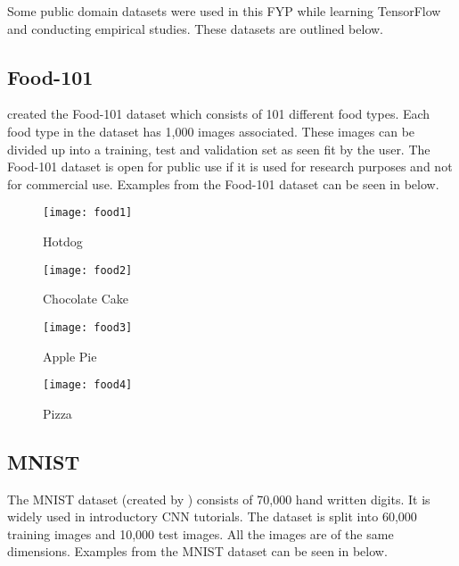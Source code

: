 Some public domain datasets were used in this FYP while learning TensorFlow and conducting empirical studies.
These datasets are outlined below.
\tocless\subsection{Food-101}
\parencite{food101} created the Food-101 dataset which consists of 101 different food types.
Each food type in the dataset has 1,000 images associated.
These images can be divided up into a training, test and validation set as seen fit by the user.
The Food-101 dataset is open for public use if it is used for research purposes and not for commercial use.
Examples from the Food-101 dataset can be seen in below.

\begin{figure}[h] 
  \label{food} 
  \begin{minipage}[b]{0.25\linewidth}
    \centering
    \texttt{[image: food1]} 
    \caption{Hotdog} 
    \vspace{4ex}
  \end{minipage}%
  \begin{minipage}[b]{0.25\linewidth}
    \centering
    \texttt{[image: food2]} 
    \caption{Chocolate Cake} 
  \label{fig:page2}
    \vspace{4ex}
  \end{minipage} 
  \begin{minipage}[b]{0.25\linewidth}
    \centering
    \texttt{[image: food3]} 
    \caption{Apple Pie} 
    \vspace{4ex}
  \end{minipage}%
  \begin{minipage}[b]{0.25\linewidth}
    \centering
    \texttt{[image: food4]} 
    \caption{Pizza} 
    \vspace{4ex}
  \end{minipage} 
\end{figure}

\tocless\subsection{MNIST}
The MNIST dataset (created by \parencite{mnist}) consists of 70,000 hand written digits.
It is widely used in introductory CNN tutorials.
The dataset is split into 60,000 training images and 10,000 test images.
All the images are of the same dimensions.
Examples from the MNIST dataset can be seen in below.

